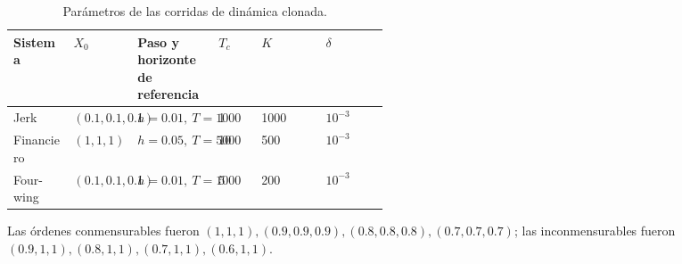 \begin{table}[H]
\centering
\small
\caption{Parámetros de las corridas de dinámica clonada.}
\begin{tabularx}{\linewidth}{L{0.16\linewidth}L{0.15\linewidth}L{0.18\linewidth}YYY}
\toprule
Sistema & \(X_0\) & Paso y horizonte de referencia & \(T_c\) & \(K\) & \(\delta\)\\
\midrule
Jerk & \((0.1,0.1,0.1)\) & \(h=0.01,\ T=1000\) & 1 & 1000 & \(10^{-3}\)\\
Financiero & \((1,1,1)\) & \(h=0.05,\ T=5000\) & 10 & 500 & \(10^{-3}\)\\
Four-wing & \((0.1,0.1,0.1)\) & \(h=0.01,\ T=1000\) & 5 & 200 & \(10^{-3}\)\\
\bottomrule
\end{tabularx}
\end{table}

Las órdenes conmensurables fueron
\((1,1,1),(0.9,0.9,0.9),(0.8,0.8,0.8),(0.7,0.7,0.7)\); las
inconmensurables fueron
\((0.9,1,1),(0.8,1,1),(0.7,1,1),(0.6,1,1)\).

